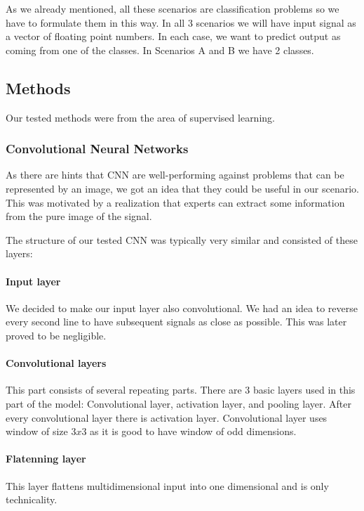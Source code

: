 As we already mentioned, all these scenarios are classification problems so we have
to formulate them in this way. In all 3 scenarios we will have input signal as a
vector of floating point numbers. In each case, we want to predict output as coming
from one of the classes. In Scenarios A and B we have 2 classes.

\subsection{Methods}

Our tested methods were from the area of supervised learning.

\subsubsection{Convolutional Neural Networks}

As there are hints that CNN are well-performing against problems that can be
represented by an image, we got an idea that they could be useful in our scenario.
This was motivated by a realization that experts can extract some information from
the pure image of the signal.

The structure of our tested CNN was typically very similar and consisted of these
layers:

\paragraph{Input layer}
We decided to make our input layer also convolutional. We had an idea to reverse
every second line to have subsequent signals as close as possible. This was later
proved to be negligible.

\paragraph{Convolutional layers}
This part consists of several repeating parts. There are 3 basic layers used in
this part of the model: Convolutional layer, activation layer, and pooling layer.
After every convolutional layer there is activation layer. Convolutional layer uses
window of size $3x3$ as it is good to have window of odd dimensions.

\paragraph{Flatenning layer}
This layer flattens multidimensional input into one dimensional and is only technicality.

